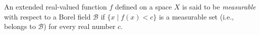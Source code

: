 An extended real-valued function $f$ defined on a space $X$ is said to be \textit{measurable} with respect to a Borel field $\mathcal{B}$ if $\{x \mid f(x) < c\}$ is a measurable set (i.e., belongs to $\mathcal{B}$) for every real number $c$.
